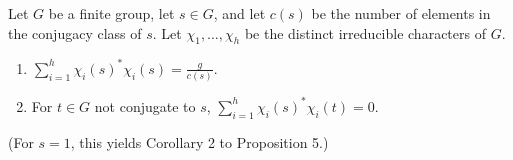 Let $G$ be a finite group, let $s \in G$, and let $c(s)$ be the number of elements in the conjugacy class of $s$. Let $\chi_1, \ldots, \chi_h$ be the distinct irreducible characters of $G$.

\begin{enumerate}
\item[(a)] $\displaystyle\sum_{i=1}^{h} \chi_i(s)^* \chi_i(s) = \frac{g}{c(s)}$.
\item[(b)] For $t \in G$ not conjugate to $s$, $\displaystyle\sum_{i=1}^{h} \chi_i(s)^* \chi_i(t) = 0$.
\end{enumerate}

(For $s = 1$, this yields Corollary 2 to Proposition 5.)